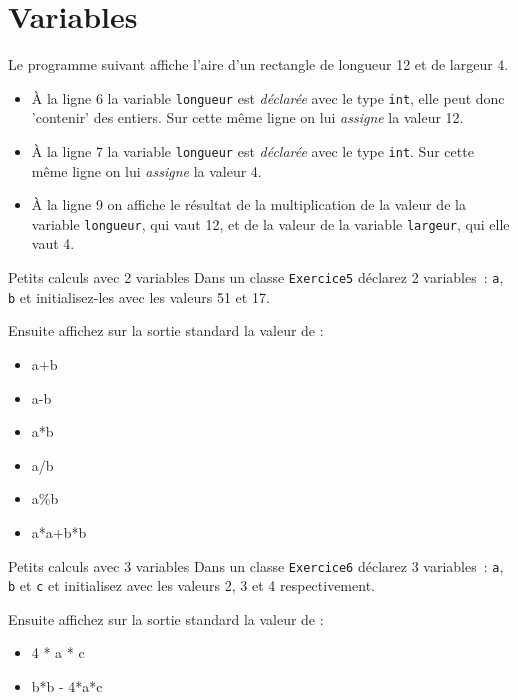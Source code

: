 \documentclass[a4paper,11pt]{article}
\begin{document}
\section{Variables}

	Le programme suivant affiche l'aire d'un rectangle de longueur 12 et de largeur 4.
	

	\begin{itemize}
		\item \`A la ligne 6 la variable \texttt{longueur} est \emph{déclarée} 
			avec le type \texttt{int}, elle peut donc 'contenir' des entiers. 
			Sur cette même ligne on lui \emph{assigne} la valeur 12.  

		\item \`A la ligne 7 la variable \texttt{longueur} est \emph{déclarée} avec le type \texttt{int}. 
			Sur cette même ligne on lui \emph{assigne} la valeur 4.
	
		\item \`A la ligne 9 on affiche le résultat de la multiplication de la valeur de la variable \texttt{longueur}, 
			qui vaut 12, et de la valeur de la variable \texttt{largeur}, qui elle vaut 4.  
  	\end{itemize}



	\begin{Exercice}{Petits calculs avec 2 variables} 		
		Dans un classe \texttt{Exercice5} déclarez 2 variables~: 
		\texttt{a}, \texttt{b} et initialisez-les avec les valeurs 51 et 17.
		
		Ensuite affichez sur la sortie standard la valeur de :
		\begin{itemize}
		 	\item a+b
			\item a-b
			\item a*b
			\item a/b
			\item a\%b
			\item a*a+b*b
		\end{itemize} 
	\end{Exercice}

	\begin{Exercice}{Petits calculs avec 3 variables} 
		Dans un classe \texttt{Exercice6} déclarez 3 variables~: 
		\texttt{a}, \texttt{b} et \texttt{c} et initialisez avec les valeurs 2, 3 et 4 respectivement.
		
		Ensuite affichez sur la sortie standard la valeur de :
		\begin{itemize}
		 	\item 4 * a * c
			\item b*b - 4*a*c
		\end{itemize} 
	\end{Exercice}
\end{document}
